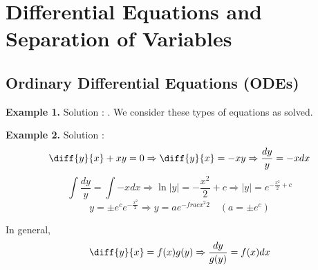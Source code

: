

\chapter{Differential Equations and Separation of Variables}
\bigbreak

\section{Ordinary Differential Equations (ODEs) }

{\bf Example 1.} 
\bigbreak
Solution : . We consider these types of equations as solved.
\bigbreak


{\bf Example 2.} 
\bigbreak
Solution :
$$
    \diff{y}{x} + xy  = 0 \Rightarrow
    \diff{y}{x} = -xy \Rightarrow
    \frac{dy}{y} = -xdx
$$
$$
    \int \frac{dy}{y} = \int -xdx \Rightarrow
    \ln|y| = -\frac{x^2}{2} + c \Rightarrow
    |y| = e^{-\frac{x^2}{2} + c}
$$
$$
    y = \pm e^c e^{-\frac{x^2}{2}} \Rightarrow
    y = ae^{-frac{x^2}{2}} \quad (a = \pm e^c)
$$


In general,
$$
\diff{y}{x} = f(x)g(y) \Rightarrow
\frac{dy}{g(y)} = f(x)dx
$$